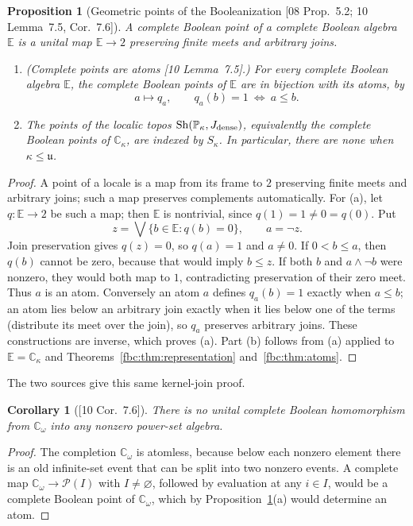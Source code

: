 \documentclass[11pt,letterpaper]{article}
\newtheorem{proposition}[theorem]{Proposition}
\newtheorem{corollary}[theorem]{Corollary}
\theoremstyle{definition}
\theoremstyle{remark}
\newcommand{\om}{\omega}
\newcommand{\C}{\mathbb C}
\newcommand{\PP}{\mathbb P}
\newcommand{\pow}{\mathcal P}
\newcommand{\cu}{\mathfrak u}
\newcommand{\Sh}{\operatorname{Sh}}
\newcommand{\Eb}{\mathbb E}
\newcommand{\src}[1]{\textup{[#1]}}
\begin{document}
\begin{proposition}[Geometric points of the Booleanization \src{08 Prop.~5.2; 10 Lemma~7.5, Cor.~7.6}]
\label{fbc:prop:points}
A \emph{complete Boolean point} of a complete Boolean algebra $\Eb$ is a
unital map $\Eb\to2$ preserving finite meets and arbitrary joins.
\begin{enumerate}[label=\textup{(\alph*)}]
\item \textup{(Complete points are atoms \src{10 Lemma~7.5}.)} For every
complete Boolean algebra $\Eb$, the complete Boolean points of $\Eb$ are
in bijection with its atoms, by
\[
 a\longmapsto q_a,\qquad q_a(b)=1\ \Longleftrightarrow\ a\leq b.
\]
\item The points of the localic topos
$\Sh(\PP_\kappa,J_{\rm dense})$, equivalently the complete Boolean
points of $\C_\kappa$, are indexed by $S_\kappa$.
In particular, there are none when $\kappa\leq\cu$.
\end{enumerate}
\end{proposition}
\begin{proof}
A point of a locale is a map from its frame to $2$ preserving finite
meets and arbitrary joins; such a map preserves complements
automatically. For \textup{(a)}, let $q:\Eb\to2$ be such a map; then
$\Eb$ is nontrivial, since $q(1)=1\ne0=q(0)$. Put
\[
 z=\bigvee\{b\in\Eb:q(b)=0\},\qquad a=\neg z.
\]
Join preservation gives $q(z)=0$, so $q(a)=1$ and $a\ne0$.
If $0<b\leq a$, then $q(b)$ cannot be zero, because that would
imply $b\leq z$. If both $b$ and $a\wedge\neg b$ were nonzero,
they would both map to $1$, contradicting preservation of their
zero meet. Thus $a$ is an atom. Conversely an atom $a$ defines
$q_a(b)=1$ exactly when $a\leq b$; an atom lies below an arbitrary join
exactly when it lies below one of the terms (distribute its meet over
the join), so $q_a$ preserves arbitrary joins. These constructions are
inverse, which proves \textup{(a)}. Part \textup{(b)} follows from
\textup{(a)} applied to $\Eb=\C_\kappa$ and
Theorems~\ref{fbc:thm:representation} and~\ref{fbc:thm:atoms}.
\end{proof}

The two sources give this same kernel-join proof.

\begin{corollary}[\src{10 Cor.~7.6}]\label{fbc:cor:no-powerset}
There is no unital complete Boolean homomorphism from $\C_\om$ into any
nonzero power-set algebra.
\end{corollary}
\begin{proof}
The completion $\C_\om$ is atomless, because below each nonzero element
there is an old infinite-set event that can be split into two nonzero
events. A complete map $\C_\om\to\pow(I)$ with $I\ne\varnothing$,
followed by evaluation at any $i\in I$, would be a complete Boolean point
of $\C_\om$, which by Proposition~\ref{fbc:prop:points}\textup{(a)} would
determine an atom.
\end{proof}
\end{document}
